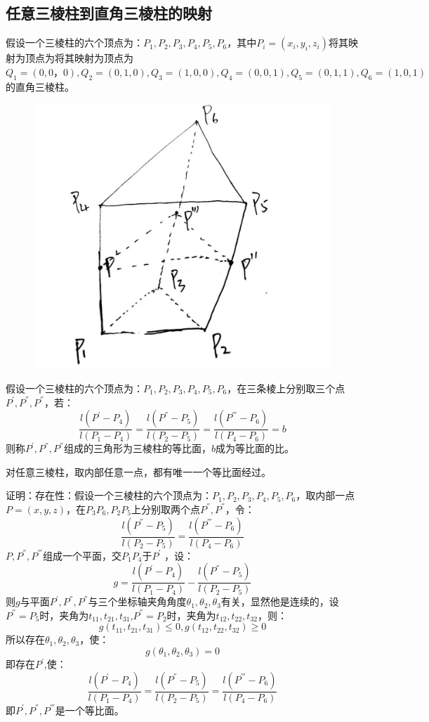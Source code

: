 \documentclass[12pt,a4paper]{article}
\begin{document}
\subsection{ 任意三棱柱到直角三棱柱的映射}
假设一个三棱柱的六个顶点为：$P_1,P_2,P_3,P_4,P_5,P_6$，其中$P_i=(x_i,y_i,z_i)$将其映射为顶点为将其映射为顶点为$Q_1=(0,0，0),Q_2=(0,1,0),Q_3=(1,0,0),Q_4=(0,0,1),Q_5=(0,1,1),Q_6=(1,0,1)$的直角三棱柱。

\begin{figure}[H]
\centering
\includegraphics[scale=0.15]{./figures/Figure_4.jpg}
\end{figure}

\begin{definition}
假设一个三棱柱的六个顶点为：$P_1,P_2,P_3,P_4,P_5,P_6$，在三条棱上分别取三个点$P^{'},P^{''},P^{''}$，若：
$$
\frac{l(P^{'}-P_4)}{l(P_1-P_4)} =\frac{l(P^{''}-P_5)}{l(P_2-P_5)} =\frac{l(P^{'''}-P_6)}{l(P_4-P_6)} =b
$$
则称$P^{'},P^{''},P^{''}$组成的三角形为三棱柱的等比面，$b$成为等比面的比。\\
\end{definition}
\begin{theorem}
对任意三棱柱，取内部任意一点，都有唯一一个等比面经过。
\end{theorem}
证明：存在性：假设一个三棱柱的六个顶点为：$P_1,P_2,P_3,P_4,P_5,P_6$，取内部一点$P=(x,y,z)$，在$P_3P_6,P_2P_5$上分别取两个点$P^{''},P^{''}$，令：
$$
\frac{l(P^{''}-P_5)}{l(P_2-P_5)} =\frac{l(P^{'''}-P_6)}{l(P_4-P_6)}
$$
$P,P^{''},P^{'''}$组成一个平面，交$P_1P_4$于$P^{'}$	，设：
$$
g=\frac{l(P^{'}-P_4)}{l(P_1-P_4)} -\frac{l(P^{''}-P_5)}{l(P_2-P_5)}
$$
则$g$与平面$P^{'},P^{''},P^{''}$与三个坐标轴夹角角度$\theta_1,\theta_2,\theta_3$有关，显然他是连续的，设$P^{''}=P_5$时，夹角为$t_{11},t_{21},t_{31}$,$P^{''}=P_2$时，夹角为$t_{12},t_{22},t_{32}$，则：
$$
g(t_{11},t_{21},t_{31})\le 0,g(t_{12},t_{22},t_{32})\ge 0
$$
所以存在$\theta_1,\theta_2,\theta_3$，使：
$$
g(\theta_1,\theta_2,\theta_3)=0
$$
即存在$P^{'}$,使：
$$
\frac{l(P^{'}-P_4)}{l(P_1-P_4)} =\frac{l(P^{''}-P_5)}{l(P_2-P_5)} =\frac{l(P^{'''}-P_6)}{l(P_4-P_6)}
$$
即$P^{'},P^{''},P^{'''}$是一个等比面。
\end{document}

